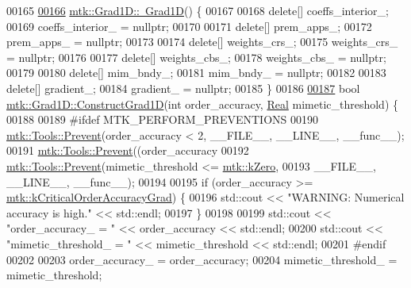 \begin{DoxyCode}
00165 
\hypertarget{mtk__grad__1d_8cc_source_l00166}{}\hyperlink{classmtk_1_1Grad1D_a2f9b1d306c0f09f36145bb1e7e486b54}{00166} \hyperlink{classmtk_1_1Grad1D_a2f9b1d306c0f09f36145bb1e7e486b54}{mtk::Grad1D::~Grad1D}() \{
00167 
00168   \textcolor{keyword}{delete}[] coeffs\_interior\_;
00169   coeffs\_interior\_ = \textcolor{keyword}{nullptr};
00170 
00171   \textcolor{keyword}{delete}[] prem\_apps\_;
00172   prem\_apps\_ = \textcolor{keyword}{nullptr};
00173 
00174   \textcolor{keyword}{delete}[] weights\_crs\_;
00175   weights\_crs\_ = \textcolor{keyword}{nullptr};
00176 
00177   \textcolor{keyword}{delete}[] weights\_cbs\_;
00178   weights\_cbs\_ = \textcolor{keyword}{nullptr};
00179 
00180   \textcolor{keyword}{delete}[] mim\_bndy\_;
00181   mim\_bndy\_ = \textcolor{keyword}{nullptr};
00182 
00183   \textcolor{keyword}{delete}[] gradient\_;
00184   gradient\_ = \textcolor{keyword}{nullptr};
00185 \}
00186 
\hypertarget{mtk__grad__1d_8cc_source_l00187}{}\hyperlink{classmtk_1_1Grad1D_a74ef5245cfae6fd158bd7f563a0c2e52}{00187} \textcolor{keywordtype}{bool} \hyperlink{classmtk_1_1Grad1D_a74ef5245cfae6fd158bd7f563a0c2e52}{mtk::Grad1D::ConstructGrad1D}(\textcolor{keywordtype}{int} order\_accuracy, 
      \hyperlink{group__c01-roots_gac080bbbf5cbb5502c9f00405f894857d}{Real} mimetic\_threshold) \{
00188 
00189 \textcolor{preprocessor}{  #ifdef MTK\_PERFORM\_PREVENTIONS}
00190   \hyperlink{classmtk_1_1Tools_a332324c6f25e66be9dff48c5987a3b9f}{mtk::Tools::Prevent}(order\_accuracy < 2, \_\_FILE\_\_, \_\_LINE\_\_, \_\_func\_\_);
00191   \hyperlink{classmtk_1_1Tools_a332324c6f25e66be9dff48c5987a3b9f}{mtk::Tools::Prevent}((order\_accuracy%
00192   \hyperlink{classmtk_1_1Tools_a332324c6f25e66be9dff48c5987a3b9f}{mtk::Tools::Prevent}(mimetic\_threshold <= \hyperlink{group__c01-roots_ga59a451a5fae30d59649bcda274fea271}{mtk::kZero},
00193                       \_\_FILE\_\_, \_\_LINE\_\_, \_\_func\_\_);
00194 
00195   \textcolor{keywordflow}{if} (order\_accuracy >= \hyperlink{group__c01-roots_ga295dd2f403c775ecd942c22b5a777496}{mtk::kCriticalOrderAccuracyGrad}) \{
00196     std::cout << \textcolor{stringliteral}{"WARNING: Numerical accuracy is high."} << std::endl;
00197   \}
00198 
00199   std::cout << \textcolor{stringliteral}{"order\_accuracy\_ = "} << order\_accuracy << std::endl;
00200   std::cout << \textcolor{stringliteral}{"mimetic\_threshold\_ = "} << mimetic\_threshold << std::endl;
00201 \textcolor{preprocessor}{  #endif}
00202 
00203   order\_accuracy\_ = order\_accuracy;
00204   mimetic\_threshold\_ = mimetic\_threshold;

\end{DoxyCode}
